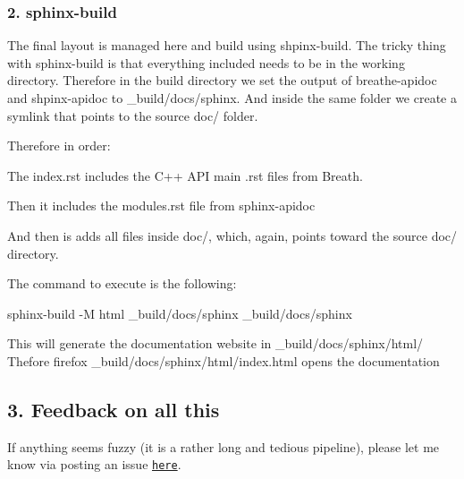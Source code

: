 \subsubsection*{2. sphinx-\/build}

The final layout is managed here and build using {\ttfamily shpinx-\/build}. The tricky thing with {\ttfamily sphinx-\/build} is that everything included needs to be in the working directory. Therefore in the build directory we set the output of {\ttfamily breathe-\/apidoc} and {\ttfamily shpinx-\/apidoc} to {\ttfamily \+\_\+build/docs/sphinx}. And inside the same folder we create a symlink that points to the source {\ttfamily doc/} folder.

Therefore in order\+:


\begin{DoxyItemize}
\item The {\ttfamily index.\+rst} includes the C++ A\+PI main {\ttfamily .rst} files from Breath.
\item Then it includes the {\ttfamily modules.\+rst} file from {\ttfamily sphinx-\/apidoc}
\item And then is adds all files inside {\ttfamily doc/}, which, again, points toward the source {\ttfamily doc/} directory.
\end{DoxyItemize}

The command to execute is the following\+: \begin{DoxyVerb}sphinx-build -M html _build/docs/sphinx _build/docs/sphinx
\end{DoxyVerb}


This will generate the documentation website in {\ttfamily \+\_\+build/docs/sphinx/html/} Thefore {\ttfamily firefox \+\_\+build/docs/sphinx/html/index.\+html} opens the documentation

\subsection*{3. Feedback on all this}

If anything seems fuzzy (it is a rather long and tedious pipeline), please let me know via posting an issue \href{https://github.com/machines-in-motion/mpi_cmake_modules/issues}{\tt here}. 